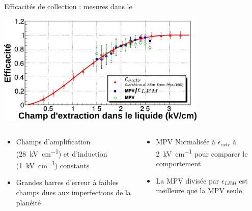     \begin{frame}{Efficacités de collection : mesures dans le \TOO{}}
        \begin{scriptsize}
            \centering
            \includegraphics[width=0.75\textwidth]{./pictures/comp_311_eff.pdf}
            \vspace{0.2cm}
            \begin{columns}
                \begin{column}{0.5\textwidth}
                    \begin{itemize}
                        \item Champs d'amplification (\SI{28}{\kilo\volt\per\centi\meter}) et d'induction (\SI{1}{\kilo\volt\per\centi\meter}) constants
                        \item Grandes barres d'erreur à faibles champs dues aux imperfections de la planéité
                    \end{itemize}
                \end{column}
                \begin{column}{0.5\textwidth}
                    \begin{itemize}
                        \item MPV Normalisée à $\epsilon_{extr}$ à \SI{2}{\kilo\volt\per\centi\meter} pour comparer le comportement
                        \item La MPV divisée par  $\epsilon_{LEM}$ est meilleure que la MPV seule.
                    \end{itemize}
                \end{column}
            \end{columns}
        \end{scriptsize}
    \end{frame}

